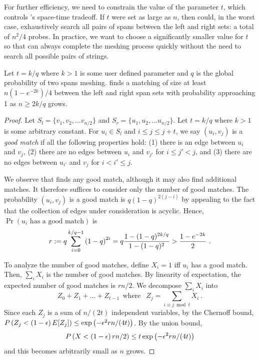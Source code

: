 For further efficiency, we need to constrain the value of the
parameter $t$, which controls \Mesh{}'s space-time tradeoff. If $t$
were set as large as $n$, then \sm could, in the worst case,
exhaustively search all pairs of spans between the left and right
sets: a total of $n^2/4$ probes.  In practice, we want to choose a
significantly smaller value for $t$ so that \Mesh{} can always
complete the meshing process quickly without the need to search all
possible pairs of strings.


\begin{lemma}
Let $t=k/q$ where $k>1$ is some user defined parameter and $q$ is the global probability of two
spans meshing. \sm finds a matching
of size at least $n(1-e^{-2k})/4$ between the left and right span sets
with probability approaching 1 as $n\geq 2k/q$ grows.
\end{lemma}

\begin{proof}
Let $S_l=\{v_1, v_2, \ldots v_{n/2}\}$ and $S_r=\{u_1,
u_2, \ldots u_{n/2}\}$. Let $t=k/q$ where
$k>1$ is some arbitrary constant. For $u_i\in S_l$ and $i \leq j \leq
j+t$, we say $(u_i,v_j)$ is a \emph{good match} if all the following
properties hold: (1) there is an edge between $u_i$ and $v_j$, (2)
there are no edges between $u_i$ and $v_{j'}$ for $i\leq j'<j$, and
(3) there are no edges between $u_{i'}$ and $v_{j}$ for $i< i'\leq j$.

We observe that \sm finds any good match, although it may
also find additional matches. It therefore suffices to consider only
the number of good matches. The probability $(u_i,v_j)$ is a good
match is $q(1-q)^{2(j-i)}$ by appealing to the fact that the collection of edges under consideration is acyclic. Hence, $\Pr(u_i \mbox{ has a good match})$
is
\begin{align*}
r:= q \sum_{i=0}^{k/q-1} \left( 1-q\right) ^{2i} = q \frac{1-(1-q)^{2k/q}}{1-(1-q)^2}
 > \frac{1-e^{-2k}}{2} \ .
\end{align*}

To analyze the number of good matches, define $X_i = 1$ iff $u_i$ has
a good match. Then, $\sum_i X_i$ is the number of good matches. By
linearity of expectation, the expected number of good matches is
$rn/2$. We decompose $\sum_i X_i$ into \[Z_0+Z_1+\ldots + Z_{t-1} ~~\mbox{
  where }~~ Z_{j} = \sum_{i\equiv j \bmod t} X_i \ .\] Since each
$Z_j$ is a sum of $n/(2t)$ independent variables, by the Chernoff
bound,\\ $P\left( Z_j < \left( 1-\epsilon \right) E[Z_j]\right) \leq \exp\left( -
\epsilon^2 r n/(4t)\right)$.  By the union bound,
$$P\left( X < \left( 1-\epsilon \right) rn/2\right) \leq t \exp\left( - \epsilon^2 r
n/(4t)\right)$$ and this becomes arbitrarily small as $n$ grows.
\end{proof}

